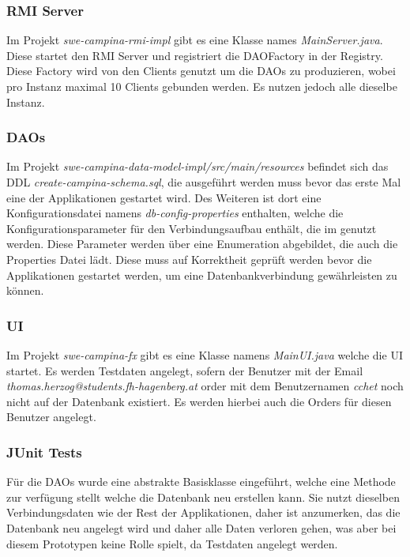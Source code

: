 \documentclass[11pt, a4paper, twoside]{article}   	%
\newcommand{\resourcesDir}{/src/main/resources}
\begin{document}
\subsubsection{RMI Server}
Im Projekt \emph{swe-campina-rmi-impl} gibt es eine Klasse names \emph{MainServer.java}. Diese startet den RMI Server und registriert die DAOFactory in der Registry. Diese Factory wird von den Clients genutzt um die DAOs zu produzieren, wobei pro Instanz maximal 10 Clients gebunden werden. Es nutzen jedoch alle dieselbe  Instanz.
\subsubsection{DAOs}
Im Projekt \emph{swe-campina-data-model-impl\resourcesDir} befindet sich das DDL \emph{create-campina-schema.sql}, die ausgeführt werden muss bevor das erste Mal eine der Applikationen gestartet wird. Des Weiteren ist dort eine Konfigurationsdatei namens \emph{db-config-properties} enthalten, welche die Konfigurationsparameter für den Verbindungsaufbau enthält, die im  genutzt werden. Diese Parameter werden über eine Enumeration  abgebildet, die auch die Properties Datei lädt. Diese muss auf Korrektheit geprüft werden bevor die Applikationen gestartet werden, um eine Datenbankverbindung gewährleisten zu können.\\
\subsubsection{UI}
Im Projekt \emph{swe-campina-fx} gibt es eine Klasse namens \emph{MainUI.java} welche die UI startet. Es werden Testdaten angelegt, sofern der Benutzer mit der Email \emph{thomas.herzog@students.fh-hagenberg.at} order mit dem Benutzernamen \emph{cchet} noch nicht auf der Datenbank existiert. Es werden hierbei auch die Orders für diesen Benutzer angelegt.
\subsubsection{JUnit Tests}
Für die DAOs wurde eine abstrakte Basisklasse eingeführt, welche eine Methode zur verfügung stellt welche die Datenbank neu erstellen kann. Sie nutzt dieselben Verbindungsdaten wie der Rest der Applikationen, daher ist anzumerken, das die Datenbank neu angelegt wird und daher alle Daten verloren gehen, was aber bei diesem Prototypen keine Rolle spielt, da Testdaten angelegt werden. 


\newpage
\end{document}
